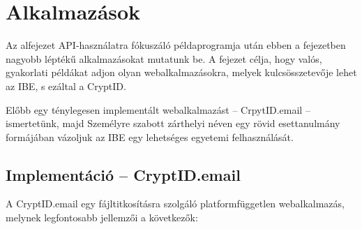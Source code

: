 \chapter{Alkalmazások}
\label{Chapter::Alkalmazasok}

Az  alfejezet API-használatra fókuszáló példaprogramja után ebben a fejezetben nagyobb léptékű alkalmazásokat mutatunk be. A fejezet célja, hogy valós, gyakorlati példákat adjon olyan webalkalmazásokra, melyek kulcsösszetevője lehet az IBE, s ezáltal a CryptID.

Előbb egy ténylegesen implementált webalkalmazást – CrpytID.email – ismertetünk, majd Személyre szabott zárthelyi néven egy rövid esettanulmány formájában vázoljuk az IBE egy lehetséges egyetemi felhasználását.

\section{Implementáció – CryptID.email}

A CryptID.email egy fájltitkosításra szolgáló platformfüggetlen webalkalmazás, melynek legfontosabb jellemzői a következők:

